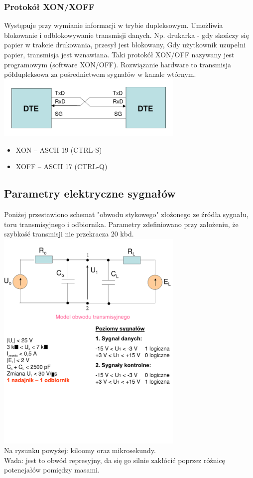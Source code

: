 \documentclass[a4paper,twoside]{article}
\begin{document}
		\subsubsection{Protokół XON/XOFF}
		Występuje przy wymianie informacji w trybie dupleksowym. Umożliwia blokowanie i odblokowywanie transmisji danych. Np. drukarka - gdy skończy się papier w trakcie drukowania, przesył jest blokowany, Gdy użytkownik uzupełni papier, transmisja jest wznawiana. Taki protokół XON/OFF nazywany jest programowym (software XON/OFF). {\small Rozwiązanie hardware to transmisja półdupleksowa za pośrednictwem sygnałów w kanale wtórnym.}\\
		\includegraphics[width=9cm]{./wyklady/RS232_9_2.pdf}
		\begin{itemize}
			\item XON – ASCII 19 (CTRL-S)
			\item XOFF – ASCII 17 (CTRL-Q)
		\end{itemize}
	\subsection{Parametry elektryczne sygnałów}
	Poniżej przestawiono schemat "obwodu stykowego" złożonego ze źródła sygnału, toru transmisyjnego i odbiornika. Parametry zdefiniowano przy założeniu, że szybkość transmisji nie przekracza 20 kbd.
	\includegraphics[width=9cm]{./wyklady/RS232_10_1.pdf}\\
	Na rysunku powyżej: kiloomy oraz mikrosekundy.\\
	Wada: jest to obwód represyjny, da się go silnie zakłócić poprzez różnicę potencjałów pomiędzy masami.
\end{document}
